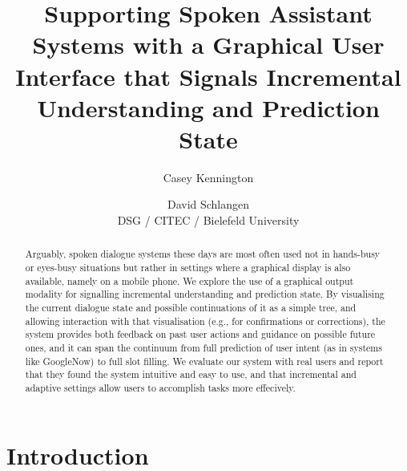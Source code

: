 \documentclass[11pt]{article}
\title{Supporting Spoken Assistant Systems with a Graphical User\\ Interface that Signals Incremental Understanding and Prediction State}
\author{Casey Kennington \and David Schlangen\\DSG / CITEC / Bielefeld University}
\begin{document}

\maketitle

\begin{abstract}
Arguably, spoken dialogue systems these days are most often used not in hands-busy or eyes-busy situations but rather in settings where a graphical display is also available, namely on a mobile phone. We explore the use of a graphical output modality for signalling incremental understanding and prediction state. By visualising the current dialogue state and possible continuations of it as a simple tree, and allowing interaction with that visualisation (e.g., for confirmations or corrections), the system provides both feedback on past user actions and guidance on possible future ones, and it can span the continuum from full prediction of user intent (as in systems like GoogleNow) to full slot filling. 
We evaluate our system with real users and report that they found the system intuitive and easy to use, and that incremental and adaptive settings allow users to accomplish tasks more effecively.
\end{abstract}

\section{Introduction}
\label{section:intro}
\end{document}
